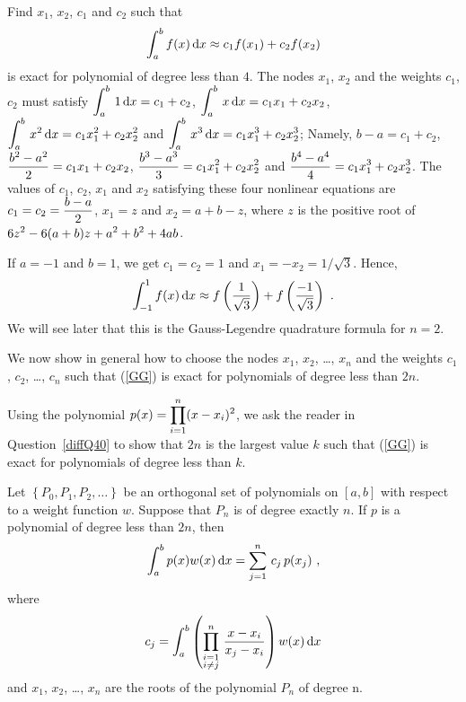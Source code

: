 \begin{egg}
Find $x_1$, $x_2$, $c_1$ and $c_2$ such that
\[
\int_a^b f(x) \,\mathrm{d}x \approx c_1 f(x_1) + c_2 f(x_2)
\]
is exact for polynomial of degree less than $4$.   The nodes $x_1$,
$x_2$ and the weights $c_1$, $c_2$ must satisfy
$\displaystyle \int_a^b\, 1 \,\mathrm{d}x = c_1 + c_2$,
$\displaystyle \int_a^b\, x \,\mathrm{d}x = c_1 x_1 + c_2 x_2$,
$\displaystyle \int_a^b\, x^2 \,\mathrm{d}x = c_1 x_1^2 + c_2 x_2^2$ and
$\displaystyle \int_a^b\, x^3 \,\mathrm{d}x = c_1 x_1^3 + c_2 x_2^3$;
Namely, $b-a = c_1 + c_2$,
$\displaystyle \frac{b^2-a^2}{2} = c_1 x_1 + c_2 x_2$,
$\displaystyle \frac{b^3-a^3}{3} = c_1 x_1^2 + c_2 x_2^2$ and
$\displaystyle \frac{b^4-a^4}{4} = c_1 x_1^3 + c_2 x_2^3$.
The values of $c_1$, $c_2$, $x_1$ and $x_2$ satisfying these four
nonlinear equations are 
$\displaystyle c_1 = c_2 = \frac{b-a}{2}$, $x_1 = z$ and
$x_2 = a+b-z$, where $z$ is the positive root of
$\displaystyle 6z^2 - 6(a+b)z + a^2 + b^2 + 4ab$.

If $a=-1$ and $b=1$, we get $c_1 = c_2 = 1$ and
$x_1 = -x_2 = 1/\sqrt{3}$.
Hence,
\[
\int_{-1}^1 f(x) \,\mathrm{d}x \approx  f\left(\frac{1}{\sqrt{3}}\right) +
f\left(\frac{-1}{\sqrt{3}}\right) \  .
\]
We will see later that this is the Gauss-Legendre quadrature formula
for $n=2$.
\end{egg}

We now show in general how to choose the nodes $x_1$, $x_2$, \ldots,
$x_n$ and the weights $c_1$, $c_2$, \ldots, $c_n$ such that (\ref{GG})
is exact for polynomials of degree less than $2n$.

\begin{rmk}
Using the polynomial
$\displaystyle p(x) = \prod_{i=1}^n (x-x_i)^2$, we ask the reader in
Question~\ref{diffQ40} to show that $2n$ is the largest value $k$ such
that (\ref{GG}) is exact for polynomials of degree less than $k$.
\end{rmk}

\begin{theorem}
Let $\left\{ P_0,P_1,P_2,\ldots \right\}$ be an orthogonal set of
polynomials on $[a,b]$ with respect to a weight function $w$.
Suppose that $P_n$ is of degree exactly $n$.  If $p$ is a
polynomial of degree less than $2n$, then
\[
\int_a^b p(x)w(x)\,\mathrm{d}x = \sum_{j=1}^n \, c_j \, p(x_j) \ ,
\]
where
\[
c_j = \int_a^b \left(
\prod_{\substack{i=1\\i\not=j}}^n\,\frac{x-x_i}{x_j-x_i}\right) w(x)\,\mathrm{d}x
\]
and $x_1$, $x_2$, \ldots, $x_n$ are the roots of the polynomial
$P_n$ of degree n.
\label{Gaussquadr}
\end{theorem}

